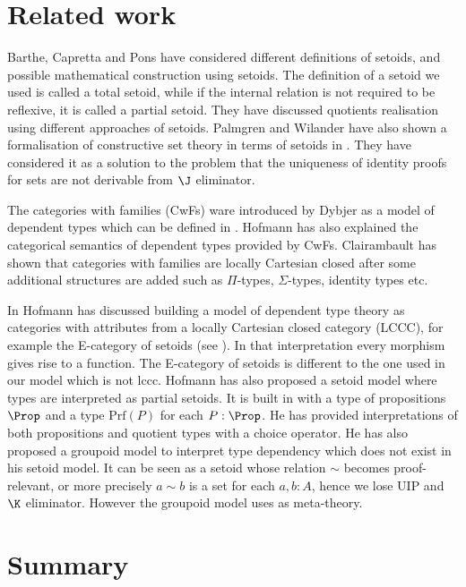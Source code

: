 \section{Related work}


Barthe, Capretta and Pons \cite{bar:03} have considered different definitions of setoids, and possible mathematical construction using setoids. The definition of a setoid we used is called a total setoid, while if the internal relation is not required to be reflexive, it is called a partial setoid.
They have discussed quotients realisation using different approaches of setoids.
Palmgren and Wilander \cite{Pal:14} have also shown a formalisation of constructive set theory in terms of setoids in \itt. They have considered it as a solution to the problem that the uniqueness of identity proofs for sets are not derivable from $\J$ eliminator.

The categories with families (CwFs) ware introduced by Dybjer \cite{Dyb:96} as a model of dependent types which can be defined in \itt. Hofmann \cite{hof:97} has also explained the categorical semantics of dependent types provided by CwFs. Clairambault \cite{clairambault2005categories} has shown that categories with families are locally Cartesian closed after some additional structures are added such as $\Pi$-types, $\Sigma$-types, identity types etc.

In \cite{hofmann1994interpretation} Hofmann has discussed building a model of dependent type theory as categories with attributes from a locally Cartesian closed category (LCCC), for example the E-category of setoids (see ). In that interpretation every morphism gives rise to a function. The E-category of setoids is different to the one used in our model which is not lccc. 
Hofmann \cite{hof:phd,hof:95:sm} has also proposed a setoid model where types are interpreted as partial setoids. It is built in \itt with a type of propositions $\Prop$ and a type $\text{Prf}(P)$ for each $P : \Prop$. He has provided interpretations of both propositions and quotient types with a choice operator.
He has also proposed a groupoid model \cite{hof:phd,MR1686862} to interpret type dependency which does not exist in his setoid model. It can be seen as a setoid whose relation $\sim$ becomes proof-relevant, or more precisely $a \sim b$ is a set for each $a, b : A$, hence we lose UIP and $\K$ eliminator. However the groupoid model uses \ett as meta-theory.

\section{Summary}

